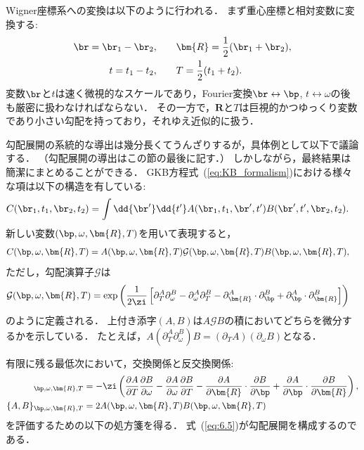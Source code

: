 \documentclass[a4paper,10pt]{jsarticle}
\begin{document}
Wigner座標系への変換は以下のように行われる．
まず重心座標と相対変数に変換する:
\begin{align}
\br = \br_1 - \br_2
, & \qquad
\bm{R} = \frac{1}{2} (\br_1 + \br_2)
, \notag \\
t = t_1 - t_2
, & \qquad
T = \frac{1}{2} (t_1 + t_2)
.\end{align}
変数$\br$と$t$は速く微視的なスケールであり，Fourier変換$\br \leftrightarrow \bp$, $t \leftrightarrow \omega$の後も厳密に扱わなければならない．
その一方で，$\bm{R}$と$T$は巨視的かつゆっくり変数であり小さい勾配を持っており，それゆえ近似的に扱う．

勾配展開の系統的な導出は幾分長くてうんざりするが，具体例として以下で議論する．
（勾配展開の導出はこの節の最後に記す．）
しかしながら，最終結果は簡潔にまとめることができる．
GKB方程式~(\ref{eq:KB_formalism})における様々な項は以下の構造を有している:
\begin{align}
C (\br_1, t_1, \br_2, t_2)
	& = \int \dd{\br'} \dd{t'} A (\br_1, t_1, \br', t') B (\br', t', \br_2, t_2)
.\end{align}
新しい変数$(\bp, \omega, \bm{R}, T)$を用いて表現すると，
\begin{align}
C (\bp, \omega, \bm{R}, T)
	& = A (\bp, \omega, \bm{R}, T) \mathcal{G} (\bp, \omega, \bm{R}, T) B (\bp, \omega, \bm{R}, T)
,\end{align}
ただし，勾配演算子$\mathcal{G}$は
\begin{align}
\mathcal{G} (\bp, \omega, \bm{R}, T)
	& = \exp \left(
		\frac{1}{2 \zi} \left[
			  \partial^{A}_{T} \partial^{B}_{\omega}
			- \partial^{A}_{\omega} \partial^{B}_{T}
			- \partial^{A}_{\bm{R}} \cdot \partial^{B}_{\bp}
			+ \partial^{A}_{\bp} \cdot \partial^{B}_{\bm{R}}
		\right]
	\right)
\end{align}
のように定義される．
上付き添字$(A, B)$は$A \mathcal{G} B$の積においてどちらを微分するかを示している．
たとえば，$A (\partial^{A}_{T} \partial^{B}_{\omega}) B = (\partial_T A) (\partial_{\omega} B)$となる．

有限に残る最低次において，交換関係と反交換関係:
\begin{align}
[A, B]_{\bp, \omega, \bm{R}, T}
	& = - \zi \left(
		\frac{\partial A}{\partial T} \frac{\partial B}{\partial \omega}
		- \frac{\partial A}{\partial \omega} \frac{\partial B}{\partial T}
		- \frac{\partial A}{\partial \bm{R}} \cdot \frac{\partial B}{\partial \bp}
		+ \frac{\partial A}{\partial \bp} \cdot \frac{\partial B}{\partial \bm{R}}
	\right)
, \notag \\
\{A, B\}_{\bp, \omega, \bm{R}, T}
	& = 2 A (\bp, \omega, \bm{R}, T) B (\bp, \omega, \bm{R}, T)
\label{eq:6.5}
\end{align}
を評価するための以下の処方箋を得る．
式~(\ref{eq:6.5})が勾配展開を構成するのである．
\end{document}
